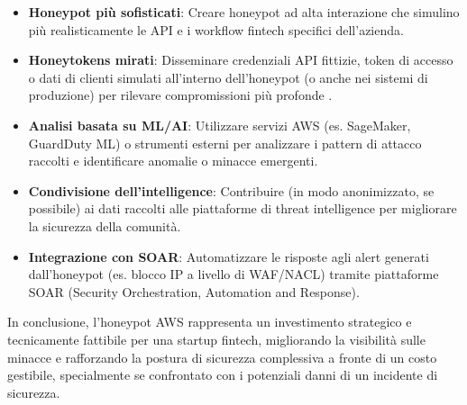 \begin{itemize}
    \item \textbf{Honeypot più sofisticati}: Creare honeypot ad alta interazione che simulino più realisticamente le API e i workflow fintech specifici dell'azienda.
    \item \textbf{Honeytokens mirati}: Disseminare credenziali API fittizie, token di accesso o dati di clienti simulati all'interno dell'honeypot (o anche nei sistemi di produzione) per rilevare compromissioni più profonde \cite{10183431}.
    \item \textbf{Analisi basata su ML/AI}: Utilizzare servizi AWS (es. SageMaker, GuardDuty ML) o strumenti esterni per analizzare i pattern di attacco raccolti e identificare anomalie o minacce emergenti.
    \item \textbf{Condivisione dell'intelligence}: Contribuire (in modo anonimizzato, se possibile) ai dati raccolti alle piattaforme di threat intelligence per migliorare la sicurezza della comunità.
    \item \textbf{Integrazione con SOAR}: Automatizzare le risposte agli alert generati dall'honeypot (es. blocco IP a livello di WAF/NACL) tramite piattaforme SOAR (Security Orchestration, Automation and Response).
\end{itemize}

In conclusione, l'honeypot AWS rappresenta un investimento strategico e tecnicamente fattibile per una startup fintech, migliorando la visibilità sulle minacce e rafforzando la postura di sicurezza complessiva a fronte di un costo gestibile, specialmente se confrontato con i potenziali danni di un incidente di sicurezza.